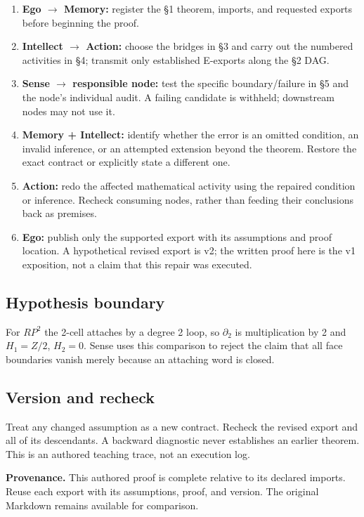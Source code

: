 \documentclass[preprint,12pt,aps,pra,showkeys,amsmath,amssymb,superscriptaddress,floatfix]{revtex4-2}
\theoremstyle{definition}
\theoremstyle{remark}
\providecommand{\tightlist}{\setlength{\itemsep}{2pt}\setlength{\parskip}{0pt}}
\begin{document}
\begin{enumerate}
\def\labelenumi{\arabic{enumi}.}
\tightlist
\item
  \textbf{Ego \(\to\) Memory:} register the §1 theorem, imports, and
  requested exports before beginning the proof.
\item
  \textbf{Intellect \(\to\) Action:} choose the bridges in §3 and carry
  out the numbered activities in §4; transmit only established E-exports
  along the §2 DAG.
\item
  \textbf{Sense \(\to\) responsible node:} test the specific
  boundary/failure in §5 and the node's individual audit. A failing
  candidate is withheld; downstream nodes may not use it.
\item
  \textbf{Memory + Intellect:} identify whether the error is an omitted
  condition, an invalid inference, or an attempted extension beyond the
  theorem. Restore the exact contract or explicitly state a different
  one.
\item
  \textbf{Action:} redo the affected mathematical activity using the
  repaired condition or inference. Recheck consuming nodes, rather than
  feeding their conclusions back as premises.
\item
  \textbf{Ego:} publish only the supported export with its assumptions
  and proof location. A hypothetical revised export is v2; the written
  proof here is the v1 exposition, not a claim that this repair was
  executed.
\end{enumerate}

\subsection{Hypothesis boundary}
For \(RP^{2}\) the 2-cell attaches by a degree 2 loop, so
\(\partial _{2}\) is multiplication by 2 and \(H_{1}=Z/2\), \(H_{2}=0\).
Sense uses this comparison to reject the claim that all face boundaries
vanish merely because an attaching word is closed.

\subsection{Version and recheck}
Treat any changed assumption as a new contract. Recheck the revised
export and all of its descendants. A backward diagnostic never
establishes an earlier theorem. This is an authored teaching trace, not
an execution log.

\par\medskip\begingroup\small\linespread{1.0}\selectfont\noindent\textbf{Provenance.} This authored proof is complete relative to its declared imports. Reuse
each export with its assumptions, proof, and version. The original
Markdown remains available for comparison.
\par\endgroup
\end{document}
